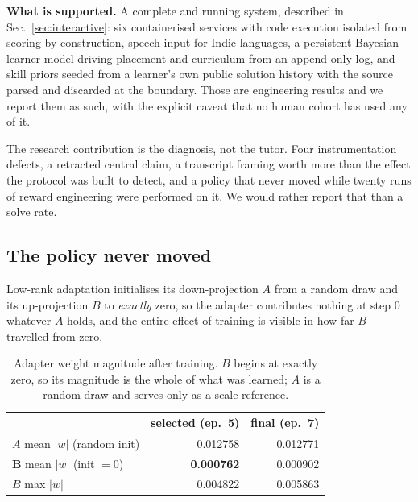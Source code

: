 \textbf{What is supported.} A complete and running system, described in
Sec.~\ref{sec:interactive}: six containerised services with code execution
isolated from scoring by construction, speech input for Indic languages, a
persistent Bayesian learner model driving placement and curriculum from an
append-only log, and skill priors seeded from a learner's own public solution
history with the source parsed and discarded at the boundary. Those are
engineering results and we report them as such, with the explicit caveat that no
human cohort has used any of it.

The research contribution is the diagnosis, not the tutor. Four instrumentation
defects, a retracted central claim, a transcript framing worth more than the
effect the protocol was built to detect, and a policy that never moved while
twenty runs of reward engineering were performed on it. We would rather report
that than a solve rate.


%
\subsection{The policy never moved}
\label{sec:nomove}

Low-rank adaptation initialises its down-projection $A$ from a random draw and
its up-projection $B$ to \emph{exactly} zero, so the adapter contributes
nothing at step 0 whatever $A$ holds, and the entire effect of training is
visible in how far $B$ travelled from zero.

\begin{table}[t]
\caption{Adapter weight magnitude after training. $B$ begins at exactly zero,
so its magnitude is the whole of what was learned; $A$ is a random draw and
serves only as a scale reference.}
\label{tab:movement}
\centering
\small
\begin{tabular}{lrr}
\toprule
 & \textbf{selected (ep.\ 5)} & \textbf{final (ep.\ 7)} \\
\midrule
$A$ mean $|w|$ (random init)  & 0.012758 & 0.012771 \\
$\mathbf{B}$ mean $|w|$ (init $=0$) & \textbf{0.000762} & 0.000902 \\
$B$ max $|w|$                 & 0.004822 & 0.005863 \\
\bottomrule
\end{tabular}
\end{table}

